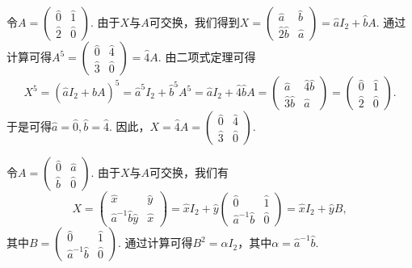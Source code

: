 \begin{solution}
  \begin{inparaenum}[(a)]
    \item 令$A=\begin{pmatrix}
      \hat 0 & \hat 1 \\
      \hat 2 & \hat 0
    \end{pmatrix}$. 由于$X$与$A$可交换，我们得到$X=\begin{pmatrix}
      \hat a & \hat b \\
      \hat 2\hat b & \hat a
    \end{pmatrix}=\hat aI_2+\hat b A$. 通过计算可得$A^5=\begin{pmatrix}
      \hat 0 & \hat 4 \\
      \hat 3 & \hat0
    \end{pmatrix}=\hat 4A$. 由二项式定理可得
    \[
      X^5 = (\hat aI_2 + \hat b A)^5 = \hat a^5I_2 + \hat b^5A^5 = \hat aI_2 + \hat 4 \hat bA =
      \begin{pmatrix}
        \hat a & \hat 4 \hat b \\
        \hat 3 \hat b & \hat a
      \end{pmatrix} = \begin{pmatrix}
        \hat 0 & \hat 1 \\
        \hat 2 & \hat 0
      \end{pmatrix}.
    \]
    于是可得$\hat a =\hat 0,\hat b =\hat4$. 因此，$X=\hat 4A=\begin{pmatrix}
      \hat 0 & \hat 4 \\
      \hat 3 & \hat0
    \end{pmatrix}$.

    \item 令$A=\begin{pmatrix}
      \hat 0 & \hat a \\
      \hat b & \hat 0
    \end{pmatrix}$. 由于$X$与$A$可交换，我们有
    \[
      X = \begin{pmatrix}
        \hat x & \hat y \\
        \hat a^{-1}\hat b\hat y & \hat x
      \end{pmatrix} = \hat xI_2 + \hat y \begin{pmatrix}
        \hat 0 & \hat 1 \\
        \hat a^{-1}\hat b & \hat 0
      \end{pmatrix} = \hat xI_2 + \hat y B,
    \]
    其中$B=\begin{pmatrix}
      \hat 0 & \hat 1 \\
      \hat a^{-1}\hat b& \hat 0
    \end{pmatrix}$. 通过计算可得$B^2=\alpha I_2$，其中$\alpha=\hat a^{-1}\hat b$.


\end{inparaenum}
\end{solution}
